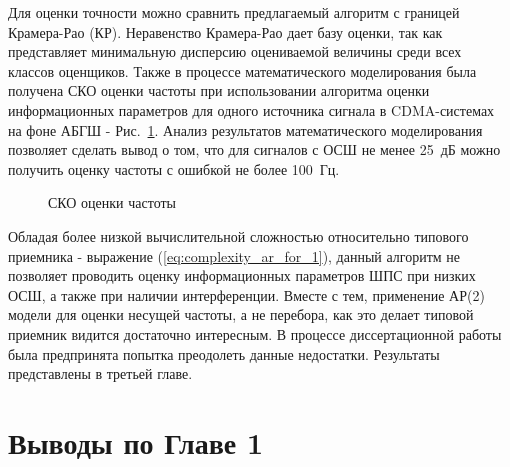Для оценки точности можно сравнить предлагаемый алгоритм с границей Крамера-Рао (КР). Неравенство Крамера-Рао дает базу оценки, так
как представляет минимальную дисперсию оцениваемой величины среди всех классов оценщиков.
Также в процессе математического моделирования была получена СКО оценки частоты при использовании алгоритма оценки информационных параметров для одного источника
сигнала в CDMA-системах на фоне АБГШ - \mbox{Рис. \ref{pic:crlb_vs_1sat_algo}}. Анализ результатов математического моделирования позволяет сделать  вывод о том,
что для сигналов с ОСШ не менее \mbox{25 дБ} можно получить оценку частоты с ошибкой не более \mbox{100 Гц}.

\begin{figure}[H]
\center{}
	\caption{СКО оценки частоты}
	\label{pic:crlb_vs_1sat_algo}
\end{figure}

Обладая более низкой вычислительной сложностью относительно типового приемника - выражение (\ref{eq:complexity_ar_for_1}), данный алгоритм не позволяет проводить
оценку информационных параметров ШПС при низких ОСШ, а также при наличии интерференции. Вместе с тем, применение АР(2) модели для оценки несущей частоты, а не перебора,
как это делает типовой приемник видится достаточно интересным. В процессе диссертационной работы была предпринята попытка преодолеть данные недостатки. Результаты
представлены в третьей главе.

\section{Выводы по Главе 1}

